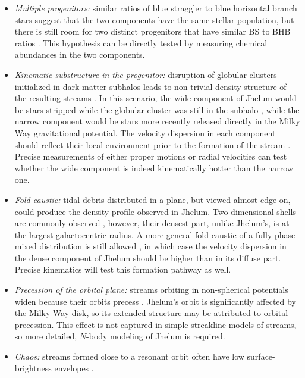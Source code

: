 \documentclass[twocolumn]{aastex62}
\begin{document}
\begin{itemize}
 \item{\emph{Multiple progenitors:} similar ratios of blue straggler to blue horizontal branch stars suggest that the two components have the same stellar population, but there is still room for two distinct progenitors that have similar BS to BHB ratios \citep[e.g., a low-mass globular cluster and a low-mass dwarf galaxy,][]{deason2015}.
 This hypothesis can be directly tested by measuring chemical abundances in the two components.
 }
 \item{\emph{Kinematic substructure in the progenitor:} disruption of globular clusters initialized in dark matter subhalos leads to non-trivial density structure of the resulting streams \citep[e.g.,][]{penarrubia2017, carlberg2018}.
 In this scenario, the wide component of Jhelum would be stars stripped while the globular cluster was still in the subhalo \citep[similar to the recently reported GD-1 cocoon,][]{malhan2019}, while the narrow component would be stars more recently released directly in the Milky Way gravitational potential.
 The velocity dispersion in each component should reflect their local environment prior to the formation of the stream \citep[e.g.,][]{fardal2015}.
 Precise measurements of either proper motions or radial velocities can test whether the wide component is indeed kinematically hotter than the narrow one.
 }
 \item{\emph{Fold caustic:} tidal debris distributed in a plane, but viewed almost edge-on, could produce the density profile observed in Jhelum.
 Two-dimensional shells are commonly observed \citep[e.g.,][]{tal2009,kadofong2018}, however, their densest part, unlike Jhelum's, is at the largest galactocentric radius.
 A more general fold caustic of a fully phase-mixed distribution is still allowed \citep[e.g.,][]{tremaine1999}, in which case the velocity dispersion in the dense component of Jhelum should be higher than in its diffuse part.
 Precise kinematics will test this formation pathway as well.
 }
 \item{\emph{Precession of the orbital plane:} streams orbiting in non-spherical potentials widen because their orbits precess \citep[e.g.,][]{erkal2016, dehnen2018}.
 Jhelum's orbit is significantly affected by the Milky Way disk, so its extended structure may be attributed to orbital precession.
 This effect is not captured in simple streakline models of streams, so more detailed, $N$-body modeling of Jhelum is required.
 }
 \item{\emph{Chaos:} streams formed close to a resonant orbit often have low surface-brightness envelopes \citep[e.g.,][]{pw2016}.
}
\end{itemize}
\end{document}
